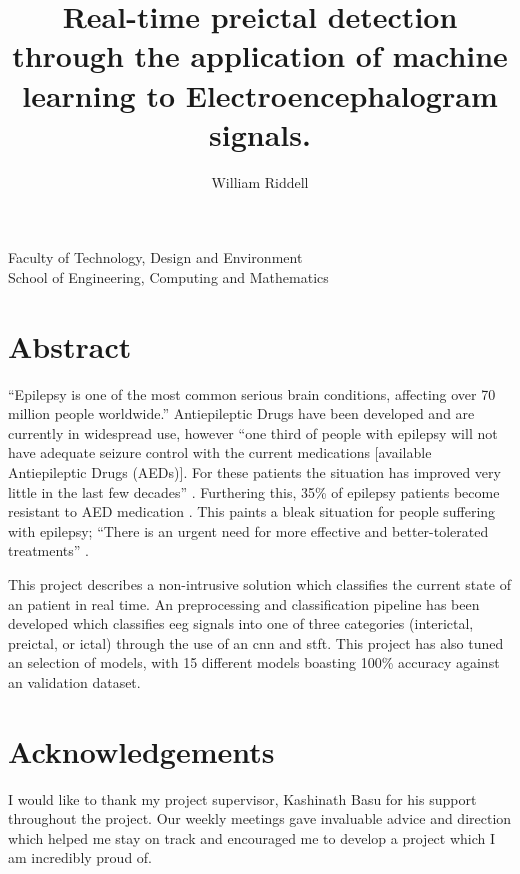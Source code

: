 \documentclass[12pt]{article}
\title{Real-time preictal detection through the application of machine learning to Electroencephalogram signals.}
\author{William Riddell}
\date{\parbox{\linewidth}{\centering
\vspace{0.5cm}
\today\endgraf\bigskip\vspace{0.5cm} 
Word Count: 10,000 \\ \vspace{0.5cm}  
Supervised by Kashinath Basu}}
\begin{document}


\maketitle

\vfill 
\begin{center} 
Faculty of Technology, Design and Environment\\
School of Engineering, Computing and Mathematics
\end{center}
\pagebreak
\tableofcontents
\listoffigures
\listoftables
\printglossary[type=\acronymtype]
\pagebreak


\section{Abstract}

“Epilepsy is one of the most common serious brain conditions, affecting over 70 million people worldwide.” \cite{thijs2019epilepsy} Antiepileptic Drugs have been developed and are currently in widespread use, however “one third of people with epilepsy will not have adequate seizure control with the current medications [available Antiepileptic Drugs (AEDs)]. For these patients the situation has improved very little in the last few decades” \cite{galanopoulou2012identification}. Furthering this, 35\% of epilepsy patients become resistant to AED medication \cite{moghim2014predicting}. This paints a bleak situation for people suffering with epilepsy; “There is an urgent need for more effective and better-tolerated treatments'' \cite{loscher2011modern}. 

This project describes a non-intrusive solution which classifies the current state of an patient in real time. An preprocessing and classification pipeline has been developed which classifies \acrfull{eeg} signals into one of three categories (interictal, preictal, or ictal) through the use of an \acrfull{cnn} and \acrfull{stft}. This project has also tuned an selection of models, with 15 different models boasting 100\% accuracy against an validation dataset. 





\section{Acknowledgements}

I would like to thank my project supervisor, Kashinath Basu for his support throughout the project. Our weekly meetings gave invaluable advice and direction which helped me stay on track and encouraged me to develop a project which I am incredibly proud of. 
\end{document}
